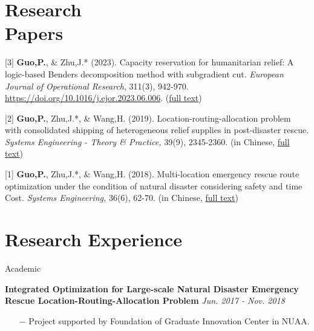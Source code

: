 \documentclass[margin]{res}
\begin{document}
\begin{resume}
\vspace{-.8em}
\section{\sc Research \\Papers}



[3] \textbf{Guo,P.}, \& Zhu,J.* (2023). Capacity reservation for humanitarian relief: A logic-based Benders decomposition method with subgradient cut. \textit{European Journal of Operational Research}, 311(3), 942-970. \url{https://doi.org/10.1016/j.ejor.2023.06.006}. (\href{https://guo.ph/publication/CapacityReservationHumanitarian2023.pdf}{full text})
\vspace{-.8em}

[2] \textbf{Guo,P.}, Zhu,J.*, \& Wang,H. (2019). Location-routing-allocation problem with consolidated shipping of heterogeneous relief supplies in post-disaster rescue. \textit{Systems Engineering - Theory \& Practice,} 39(9), 2345-2360. (in Chinese, \href{https://guo.ph/publication/zh-LocationRoutingAllocation.pdf}{full text})
\vspace{-.8em}

[1] \textbf{Guo,P.}, Zhu,J.*, \& Wang,H. (2018). Multi-location emergency rescue route optimization under the condition of natural disaster considering safety and time Cost. \textit{Systems Engineering,} 36(6), 62-70. (in Chinese, \href{https://guo.ph/publication/zh-RiskTime.pdf}{full text})

\vspace{-.8em}
\section{\sc Research Experience}


{\sc Academic}
\vspace{-.8em}

\textbf{{Integrated Optimization for Large-scale Natural Disaster Emergency Rescue Location-Routing-Allocation Problem}} \hspace{65pt} {\it Jun. 2017 - Nov. 2018}
\begin{itemize} \itemsep -2pt  %
\item[\(-\)] Project supported by {Foundation of Graduate Innovation Center in NUAA}.
\end{itemize}



\end{resume}
\end{document}
